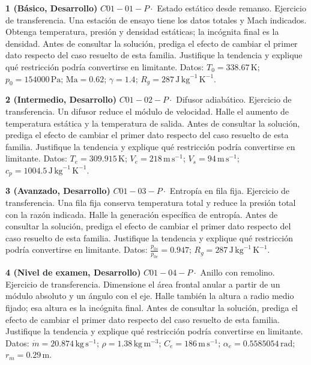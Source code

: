 \documentclass[10pt,openany]{book}
\begin{document}
\begin{tcolorbox}[title={Ejercicios propuestos}, studiumworked, breakable]

\noindent\textbf{1 (Básico, Desarrollo)}
\(C01-01-P \cdot\) Estado estático desde remanso. Ejercicio de transferencia. Una estación de ensayo tiene los datos totales y Mach indicados. Obtenga temperatura, presión y densidad estáticas; la incógnita final es la densidad. Antes de consultar la solución, prediga el efecto de cambiar el primer dato respecto del caso resuelto de esta familia. Justifique la tendencia y explique qué restricción podría convertirse en limitante. Datos: \(T_0=338.67\, \mathrm{K}\); \(p_0=154000\, \mathrm{Pa}\); \(\mathrm{Ma}=0.62\); \(\gamma=1.4\); \(R_g=287\, \mathrm{J}\,\mathrm{kg}^{-1}\,\mathrm{K}^{-1}\).

\noindent\textbf{2 (Intermedio, Desarrollo)}
\(C01-02-P \cdot\) Difusor adiabático. Ejercicio de transferencia. Un difusor reduce el módulo de velocidad. Halle el aumento de temperatura estática y la temperatura de salida. Antes de consultar la solución, prediga el efecto de cambiar el primer dato respecto del caso resuelto de esta familia. Justifique la tendencia y explique qué restricción podría convertirse en limitante. Datos: \(T_e=309.915\, \mathrm{K}\); \(V_e=218\, \mathrm{m}\,\mathrm{s}^{-1}\); \(V_s=94\, \mathrm{m}\,\mathrm{s}^{-1}\); \(c_p=1004.5\, \mathrm{J}\,\mathrm{kg}^{-1}\,\mathrm{K}^{-1}\).

\noindent\textbf{3 (Avanzado, Desarrollo)}
\(C01-03-P \cdot\) Entropía en fila fija. Ejercicio de transferencia. Una fila fija conserva temperatura total y reduce la presión total con la razón indicada. Halle la generación específica de entropía. Antes de consultar la solución, prediga el efecto de cambiar el primer dato respecto del caso resuelto de esta familia. Justifique la tendencia y explique qué restricción podría convertirse en limitante. Datos: \(\frac{p_{0s}}{p_{0e}}=0.947\); \(R_g=287\, \mathrm{J}\,\mathrm{kg}^{-1}\,\mathrm{K}^{-1}\).

\noindent\textbf{4 (Nivel de examen, Desarrollo)}
\(C01-04-P \cdot\) Anillo con remolino. Ejercicio de transferencia. Dimensione el área frontal anular a partir de un módulo absoluto y un ángulo con el eje. Halle también la altura a radio medio fijado; esa altura es la incógnita final. Antes de consultar la solución, prediga el efecto de cambiar el primer dato respecto del caso resuelto de esta familia. Justifique la tendencia y explique qué restricción podría convertirse en limitante. Datos: \(\dot m=20.874\, \mathrm{kg}\,\mathrm{s}^{-1}\); \(\rho=1.38\, \mathrm{kg}\,\mathrm{m}^{-3}\); \(C_e=186\, \mathrm{m}\,\mathrm{s}^{-1}\); \(\alpha_e=0.5585054\, \mathrm{rad}\); \(r_m=0.29\, \mathrm{m}\).
\end{tcolorbox}
\end{document}
